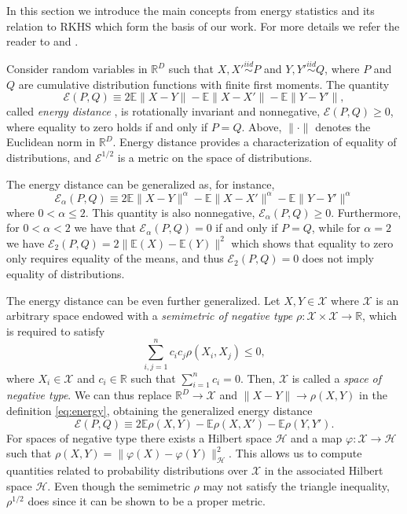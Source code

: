 \documentclass[aps,preprint,nofootinbib,floatfix]{revtex4-1}
\newcommand\Energy{\mathcal{E}}
\newcommand\E{\mathbb{E}}
\begin{document}
In this section we introduce the main concepts from energy
statistics and its relation to 
RKHS which form the basis of our work.
For more details we refer the reader
to \cite{Szkely2013} and \cite{Sejdinovic2013}.

Consider random variables in $\mathbb{R}^D$ 
such that $X,X' \stackrel{iid}{\sim} P$ and 
$Y,Y' \stackrel{iid}{\sim} Q$, where $P$ and $Q$ are cumulative
distribution functions with finite first moments. 
The quantity 
\begin{equation}
\label{eq:energy}
\Energy(P, Q) \equiv 2 \E \| X - Y\| - \E \| X - X' \| - \E \| Y - Y' \|,
\end{equation}
called \emph{energy distance} \cite{Szkely2013}, 
is rotationally invariant and nonnegative, $\Energy(P,Q) \ge 0$, where
equality
to zero holds if and only if $P = Q$.
Above, $\| \cdot \|$ denotes the
Euclidean norm in $\mathbb{R}^D$. 
Energy distance
provides a characterization of equality of distributions, and
$\Energy^{1/2}$ is
a metric on the space of distributions.

The energy distance can be generalized as, for instance,
\begin{equation}
\label{eq:energy2}
\Energy_\alpha(P, Q) \equiv 
2 \E \| X - Y\|^{\alpha} - \E \| X - X' \|^{\alpha} - 
\E \| Y - Y' \|^{\alpha}
\end{equation}
where $0<\alpha\le 2$. This quantity is also nonnegative,
$\Energy_\alpha(P,Q) \ge 0$. Furthermore, for $0<\alpha<2$ we have that
$\Energy_\alpha(P,Q) = 0$ if and only if $P=Q$, while for $\alpha=2$ 
we have $\Energy_2(P,Q) = 2\| \E(X) - \E(Y) \|^2$ which shows that
equality to zero only requires
equality of the means, and thus $\Energy_2(P,Q)=0$ does 
not imply equality of distributions.

The energy distance can be even further generalized.
Let $X, Y \in \mathcal{X}$  where $\mathcal{X}$ is an arbitrary space endowed
with a \emph{semimetric of negative type}
$\rho: \mathcal{X}\times\mathcal{X} \to \mathbb{R}$, which is required
to satisfy
\begin{equation}
\label{eq:negative_type}
\sum_{i,j=1}^n c_i c_j \rho(X_i, X_j) \le 0,
\end{equation}
where $X_i \in \mathcal{X}$ and $c_i \in \mathbb{R}$ such that
$\sum_{i=1}^n c_i = 0$. Then, $\mathcal{X}$ is called a \emph{space of
negative type}.
We can thus replace $\mathbb{R}^D \to \mathcal{X}$ and 
$\| X - Y \| \to \rho(X , Y)$ in the definition \eqref{eq:energy}, obtaining
the generalized energy distance
\begin{equation}
\label{eq:energy3}
\Energy(P, Q) \equiv 2 \E \rho(X,Y) - \E \rho(X, X') - \E \rho(Y,Y').
\end{equation}
For spaces of negative type there exists a Hilbert space $\mathcal{H}$ and
a map $\varphi: \mathcal{X} \to
\mathcal{H}$ such that
$\rho(X, Y) = \| \varphi(X) - \varphi(Y) \|_{\mathcal{H}}^2$. This
allows us to compute quantities related to probability distributions over
$\mathcal{X}$ in the associated Hilbert space $\mathcal{H}$.
Even though the semimetric 
$\rho$ may not satisfy the triangle inequality, 
$\rho^{1/2}$ does since it can be shown to be a proper metric. 
\end{document}
